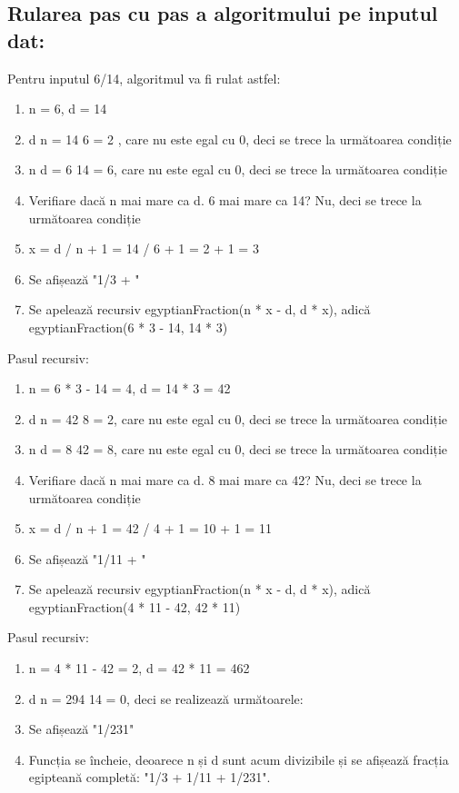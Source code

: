 \documentclass[runningheads]{llncs}
\begin{document}
\subsection{Rularea pas cu pas a algoritmului pe inputul dat:
}

Pentru inputul 6/14, algoritmul va fi rulat astfel:\newline

\begin{enumerate}
\item n = 6, d = 14
\item d \text{\%} n = 14 \text{\%} 6 = 2 , care nu este egal cu 0, deci se trece la următoarea condiție
\item n \text{\%} d = 6 \text{\%} 14 = 6, care nu este egal cu 0, deci se trece la următoarea condiție
\item Verifiare dacă n mai mare ca d. 6 mai mare ca 14? Nu, deci se trece la următoarea condiție
\item x = d / n + 1 = 14 / 6 + 1 = 2 + 1 = 3
\item Se afișează "1/3 + "
\item Se apelează recursiv egyptianFraction(n * x - d, d * x), adică egyptianFraction(6 * 3 - 14, 14 * 3)
\end{enumerate}

			Pasul recursiv:

\begin{enumerate}
    \item n = 6 * 3 - 14 = 4, d = 14 * 3 = 42
\item d\text{\%} n = 42 \text{\%} 8 = 2, care nu este egal cu 0, deci se trece la următoarea condiție
\item n \text{\%} d = 8 \text{\%} 42 = 8, care nu este egal cu 0, deci se trece la următoarea condiție
\item Verifiare dacă n mai mare ca d. 8 mai mare ca 42? Nu, deci se trece la următoarea condiție
\item x = d / n + 1 = 42 / 4 + 1 = 10 + 1 = 11
\item Se afișează "1/11 + "
\item Se apelează recursiv egyptianFraction(n * x - d, d * x), adică egyptianFraction(4 * 11 - 42, 42 * 11)
\end{enumerate}

			Pasul recursiv:
\begin{enumerate}
    \item n = 4 * 11 - 42 = 2, d = 42 * 11 = 462
\item d \text{\%} n = 294 \text{\%} 14 = 0, deci se realizează următoarele:
\item Se afișează "1/231"
\item Funcția se încheie, deoarece n și d sunt acum divizibile și se afișează fracția egipteană completă: "1/3 + 1/11 + 1/231".
\end{enumerate}
\end{document}
